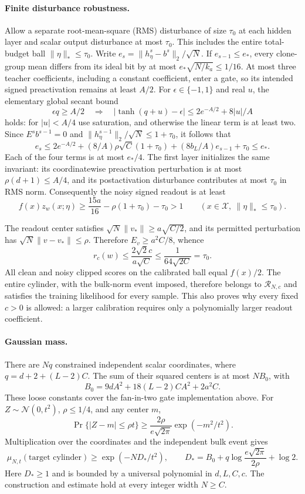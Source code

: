 \paragraph{Finite disturbance robustness.}
Allow a separate root-mean-square (RMS) disturbance of size $\tau_0$ at each
hidden layer and scalar output disturbance at most $\tau_0$. This includes the entire
total-budget ball $\|\eta\|_*\le\tau_0$.
Write $e_s=\|h^s_\eta-b^s\|_2/\sqrt N$.
If $e_{s-1}\le e_*$, every clone-group mean differs from its ideal bit by
at most $e_*\sqrt{N/k_a}\le1/16$. At most three teacher coefficients,
including a constant coefficient, enter a gate, so its intended signed
preactivation remains at least $A/2$.
For $\epsilon\in\{-1,1\}$ and real $u$, the elementary global secant bound
\[
 \epsilon q\ge A/2
 \quad\Longrightarrow\quad
 |\tanh(q+u)-\epsilon|\le2e^{-A/2}+8|u|/A
\]
holds: for $|u|<A/4$ use saturation, and otherwise the linear term is at
least two. Since $E^sb^{s-1}=0$ and
$\|h^{s-1}_\eta\|_2/\sqrt N\le1+\tau_0$, it follows that
\[
 e_s\le2e^{-A/2}+
          (8/A)\rho\sqrt C(1+\tau_0)
          +(8b_L/A)e_{s-1}+\tau_0\le e_*.
\]
Each of the four terms is at most $e_*/4$.
The first layer initializes the same invariant: its coordinatewise
preactivation perturbation is at most $\rho(d+1)\le A/4$, and its
postactivation disturbance contributes at most $\tau_0$ in RMS norm.
Consequently the noisy signed readout is at least
\[
 f(x)z_w(x;\eta)
 \ge\frac{15a}{16}-\rho(1+\tau_0)-\tau_0>1
 \qquad(x\in\mathcal X,\ \|\eta\|_*\le\tau_0).
\]

The readout center satisfies $\sqrt N\|v_*\|\ge a\sqrt{C/2}$, and its
permitted perturbation has $\sqrt N\|v-v_*\|\le\rho$.
Therefore $E_v\ge a^2C/8$, whence
\[
 r_c(w)\le\frac{2\sqrt2c}{a\sqrt C}
       \le\frac1{64\sqrt{2C}}=\tau_0.
\]
All clean and noisy clipped scores on the calibrated ball equal $f(x)/2$.
The entire cylinder, with the bulk-norm event imposed, therefore belongs
to $\mathcal R_{N,c}$ and satisfies the training likelihood for every sample.
This also proves why every fixed $c>0$ is allowed: a larger calibration
requires only a polynomially larger readout coefficient.

\paragraph{Gaussian mass.}
There are $Nq$ constrained independent scalar coordinates, where
$q=d+2+(L-2)C$. The sum of their squared centers is at most $NB_0$, with
\[
 B_0=9dA^2+18(L-2)CA^2+2a^2C.
\]
These loose constants cover the fan-in-two gate implementation above.
For $Z\sim\mathcal N(0,t^2)$, $\rho\le1/4$, and any center $m$,
\[
 \Pr\{|Z-m|\le\rho t\}
 \ge\frac{2\rho}{e\sqrt{2\pi}}\exp(-m^2/t^2).
\]
Multiplication over the coordinates and the independent bulk event gives
\begin{equation}\label{eq:standalone-cylinder-mass}
 \mu_{N,t}(\text{target cylinder})
 \ge\exp(-ND_*/t^2),\qquad
 D_*=B_0+q\log\frac{e\sqrt{2\pi}}{2\rho}+\log2.
\end{equation}
Here $D_*\ge1$ and is bounded by a universal polynomial in $d,L,C,c$.
The construction and estimate hold at every integer width $N\ge C$.
